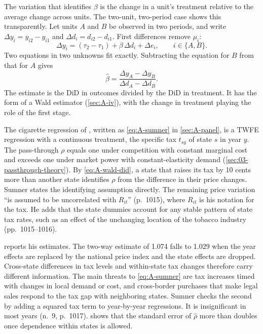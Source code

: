 The variation that identifies $\beta$ is the change in a unit's treatment relative to the average change across
units. The two-unit, two-period case shows this transparently. Let units $A$ and $B$ be observed in two periods, and
write $\Delta y_i=y_{i2}-y_{i1}$ and $\Delta d_i=d_{i2}-d_{i1}$. First differences remove $\mu_i$:
\begin{equation*}
\Delta y_i=(\tau_2-\tau_1)+\beta\,\Delta d_i+\Delta e_i,\qquad i\in\{A,B\}.
\end{equation*}
Two equations in two unknowns fit exactly. Subtracting the equation for $B$ from that for $A$ gives
\begin{equation}\label{eq:A-wald-did}
\hat\beta=\frac{\Delta y_A-\Delta y_B}{\Delta d_A-\Delta d_B}.
\end{equation}
The estimate is the DiD in outcomes divided by the DiD in treatment. It has the form of a Wald estimator
(\cref{sec:A-iv}), with the change in treatment playing the role of the first stage.

The cigarette regression of \citet{Sumner1981}, written as \eqref{eq:A-sumner} in \cref{sec:A-panel}, is a TWFE
regression with a continuous treatment, the specific tax $t_{sy}$ of state $s$ in year $y$. The pass-through $\rho$
equals one under competition with constant marginal cost and exceeds one under market power with constant-elasticity
demand (\cref{sec:03-passthrough-theory}). By \eqref{eq:A-wald-did}, a state that raises its tax by 10 cents more than
another state identifies $\rho$ from the difference in their price changes. Sumner states the identifying assumption
directly. The remaining price variation ``is assumed to be uncorrelated with $R_{it}$'' (p.~1015), where $R_{it}$ is his
notation for the tax. He adds that the state dummies account for any stable pattern of state tax rates, such as an
effect of the unchanging location of the tobacco industry (pp.~1015--1016).

 reports his estimates. The two-way estimate of 1.074 falls to 1.029 when the year effects are
replaced by the national price index and the state effects are dropped. Cross-state differences in tax levels and
within-state tax changes therefore carry different information. The main threats to \eqref{eq:A-sumner} are tax
increases timed with changes in local demand or cost, and cross-border purchases that make legal sales respond to the
tax gap with neighboring states. Sumner checks the second by adding a squared tax term to year-by-year regressions. It
is insignificant in most years (n.~9, p.~1017).  shows that the standard error of $\hat\rho$ more
than doubles once dependence within states is allowed.

